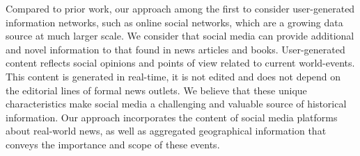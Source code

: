 Compared to prior work, our approach among the first to consider user-generated
information networks, such as online social networks, which are a growing data
source at much larger scale.  
%
We consider that social media can provide additional and novel information to
that found in news articles and books. 
%
User-generated content reflects social opinions and points of view related to
current world-events. 
%
This content is generated in real-time, it is not edited and does not depend on
the editorial lines of formal news outlets.  
%
We believe that these unique characteristics make social media a challenging and
valuable source of historical information.  
%
Our approach incorporates the content of social media platforms about real-world
news, as well as aggregated geographical information that conveys the importance
and scope of these events.